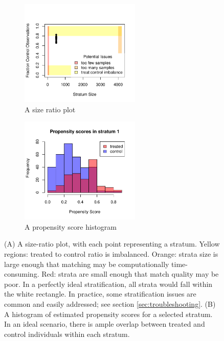 \begin{figure}[htbp]
\centering
    \begin{subfigure}[t]{2.25in}
        \centering
        \includegraphics[width = 2.25in]{Figure1A.pdf}
        \caption{A size ratio plot}
    \end{subfigure}
    \begin{subfigure}[t]{2.25in}
        \centering
        \includegraphics[width = 2.25in]{Figure1B.pdf}
        \caption{A propensity score histogram}
    \end{subfigure}
    \caption{ (A) A size-ratio plot, with each point representing a stratum. Yellow regions: treated to control ratio is imbalanced. Orange: strata size is large enough that matching may be computationally time-consuming. Red: strata are small enough that match quality may be poor. In a perfectly ideal stratification, all strata would fall within the white rectangle.  In practice, some stratification issues are common and easily addressed; see section \ref{sec:troubleshooting}. (B) A histogram of estimated propensity scores for a selected stratum. In an ideal scenario, there is ample overlap between treated and control individuals within each stratum. }
    \label{fig:SR_simulated}
\end{figure}

